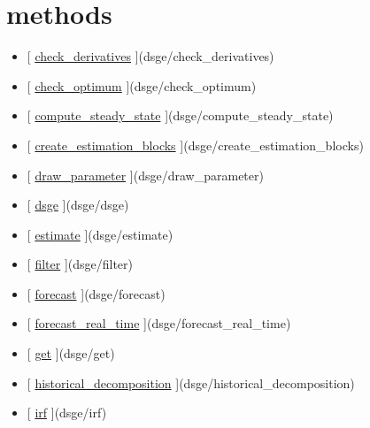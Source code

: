 \documentclass[letterpaper,10pt,english]{sphinxmanual}
\begin{document}
\section{methods}
\label{classes/models/@dsge/dsge:methods}\begin{itemize}
\item {} 
{[} {\hyperref[classes/models/@dsge/dsge:check-derivatives]{check\_derivatives}} {]}(dsge/check\_derivatives)

\item {} 
{[} {\hyperref[classes/models/@dsge/dsge:check-optimum]{check\_optimum}} {]}(dsge/check\_optimum)

\item {} 
{[} {\hyperref[classes/models/@dsge/dsge:compute-steady-state]{compute\_steady\_state}} {]}(dsge/compute\_steady\_state)

\item {} 
{[} {\hyperref[classes/models/@dsge/dsge:create-estimation-blocks]{create\_estimation\_blocks}} {]}(dsge/create\_estimation\_blocks)

\item {} 
{[} {\hyperref[classes/models/@dsge/dsge:draw-parameter]{draw\_parameter}} {]}(dsge/draw\_parameter)

\item {} 
{[} {\hyperref[classes/models/@dsge/dsge:dsge]{dsge}} {]}(dsge/dsge)

\item {} 
{[} {\hyperref[classes/models/@dsge/dsge:estimate]{estimate}} {]}(dsge/estimate)

\item {} 
{[} {\hyperref[classes/models/@dsge/dsge:filter]{filter}} {]}(dsge/filter)

\item {} 
{[} {\hyperref[classes/models/@dsge/dsge:forecast]{forecast}} {]}(dsge/forecast)

\item {} 
{[} {\hyperref[classes/models/@dsge/dsge:forecast-real-time]{forecast\_real\_time}} {]}(dsge/forecast\_real\_time)

\item {} 
{[} {\hyperref[classes/models/@dsge/dsge:get]{get}} {]}(dsge/get)

\item {} 
{[} {\hyperref[classes/models/@dsge/dsge:historical-decomposition]{historical\_decomposition}} {]}(dsge/historical\_decomposition)

\item {} 
{[} {\hyperref[classes/models/@dsge/dsge:irf]{irf}} {]}(dsge/irf)


\end{itemize}
\end{document}
